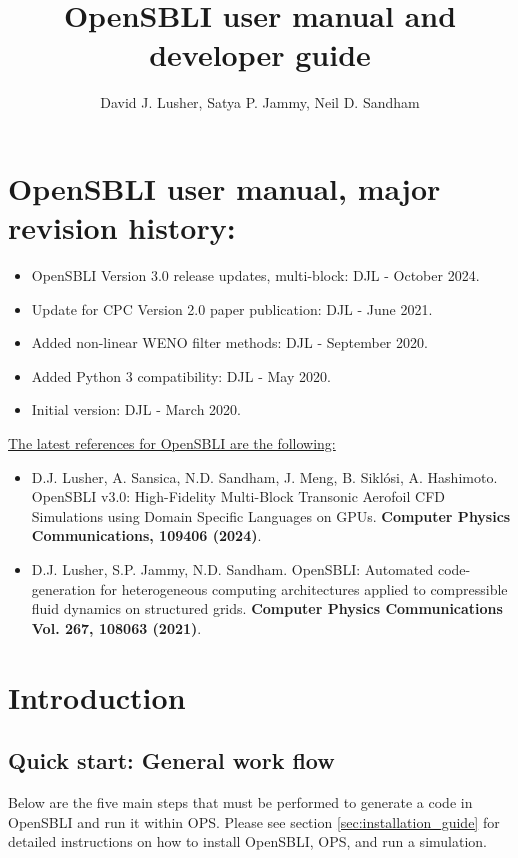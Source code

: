 \documentclass[11pt]{article}
\begin{document}
\title{OpenSBLI user manual and developer guide}
\author{David J. Lusher, Satya P. Jammy, Neil D. Sandham}
\maketitle


\section*{OpenSBLI user manual, major revision history:}
\begin{itemize}
  \item{OpenSBLI Version 3.0 release updates, multi-block: DJL - October 2024.}
  \item{Update for CPC Version 2.0 paper publication: DJL - June 2021.}
  \item{Added non-linear WENO filter methods: DJL - September 2020.}
  \item{Added Python 3 compatibility: DJL - May 2020.}
	\item{Initial version: DJL - March 2020.}
\end{itemize}

\noindent \underline{The latest references for OpenSBLI are the following:}

\begin{itemize}
  
\item D.J. Lusher, A. Sansica, N.D. Sandham, J. Meng, B. Siklósi, A. Hashimoto. OpenSBLI v3.0: High-Fidelity Multi-Block Transonic Aerofoil CFD Simulations using Domain Specific Languages on GPUs. \textbf{Computer Physics Communications, 109406 (2024)}.

\item D.J. Lusher, S.P. Jammy, N.D. Sandham. OpenSBLI: Automated code-generation for heterogeneous computing architectures applied to compressible fluid dynamics on structured grids. \textbf{Computer Physics Communications Vol. 267, 108063 (2021)}.


\end{itemize}

\section*{Introduction}

\subsection*{Quick start: General work flow}
Below are the five main steps that must be performed to generate a code in OpenSBLI and run it within OPS. Please see section \ref{sec:installation_guide} for detailed instructions on how to install OpenSBLI, OPS, and run a simulation. 
\end{document}

